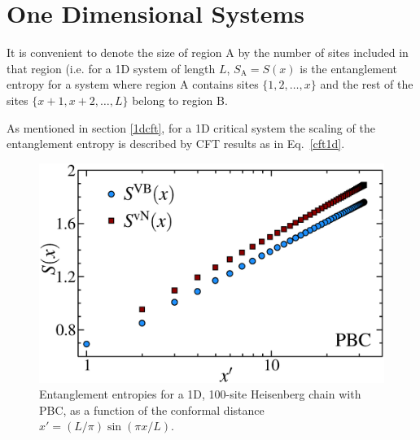 \section{One Dimensional Systems}


It is convenient to denote the size of region A by the number of sites included in that region 
(i.e. for a 1D system of length $L$, $S_{\text{A}} = S(x)$ is the entanglement entropy for a system where region A contains sites $\{1,2,\dots,x\}$ and the rest of the sites $\{x+1,x+2,\dots,L\}$
belong to region B.

As mentioned in section \ref{1dcft}, for a 1D critical system the scaling of the entanglement entropy is described by CFT results as in Eq.~\eqref{cft1d}. 

\begin{figure} {
\includegraphics[width=5.5in]{./figures/paper1/figure1/thesis_pbc.eps} 
\centering
\caption[1D PBC Results for \vb with \vn]{
Entanglement entropies for a 1D, 100-site Heisenberg chain with PBC, as a function of the conformal distance $x'  = (L/\pi)\sin (\pi x/L)$.
\label{1dPBC}}
} 
\end{figure}

